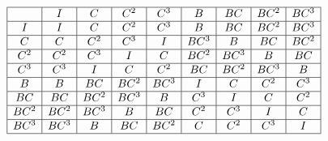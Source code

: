 \documentclass[../gatm.tex]{subfiles}
\begin{document}
$$\begin{array}{|c|c|c|c|c|c|c|c|c|}
\hline
& I & C & C^2 & C^3 & B & BC & BC^2 & BC^3 \\ \hline
I & I & C & C^2 & C^3 & B & BC & BC^2 & BC^3 \\ \hline
C & C & C^2 & C^3 & I & BC^3 & B & BC & BC^2 \\ \hline
C^2 & C^2 & C^3 & I & C & BC^2 & BC^3 & B & BC \\ \hline
C^3 & C^3 & I & C & C^2 & BC & BC^2 & BC^3 & B \\ \hline
B & B & BC & BC^2 & BC^3 & I & C & C^2 & C^3 \\ \hline
BC & BC & BC^2 & BC^3 & B & C^3 & I & C & C^2 \\ \hline
BC^2 & BC^2 & BC^3 & B & BC & C^2 & C^3 & I & C \\ \hline
BC^3 & BC^3 & B & BC & BC^2 & C & C^2 & C^3 & I \\ \hline
\end{array}$$
\end{document}
